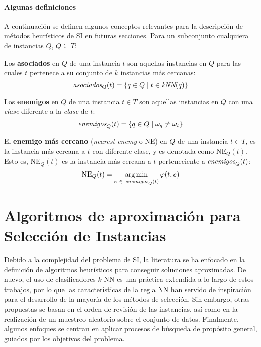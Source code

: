 \paragraph*{Algunas definiciones}
A continuación se definen algunos conceptos relevantes para la descripción de métodos heurísticos de SI en futuras secciones. Para un subconjunto cualquiera de instancias $Q$, $Q \subseteq T$:\\

\begin{definicion}
Los \textbf{asociados} en $Q$ de una instancia $t$ son aquellas instancias en $Q$ para las cuales $t$ pertenece a su conjunto de $k$ instancias más cercanas:
\begin{equation}
\emph{asociados}_Q(t) = \left\lbrace q \in Q \mid t\in \emph{kNN}(q) \right\rbrace
\end{equation}
\end{definicion}

\begin{definicion}
Los \textbf{enemigos} en $Q$ de una instancia $t \in T$ son aquellas instancias en $Q$ con una \emph{clase} diferente a la \emph{clase} de $t$:
\begin{equation}
\emph{enemigos}_Q(t) = \left\lbrace q \in Q \mid \omega_{q} \neq \omega_{t} \right\rbrace
\end{equation}
\end{definicion}

\begin{definicion}
El \textbf{enemigo más cercano} (\emph{nearest enemy} o NE) en $Q$ de una instancia $t \in T$, es la instancia más cercana a $t$ con diferente clase, y es denotada como $\mathrm{NE}_Q(t)$. Esto es, $\mathrm{NE}_Q(t)$ es la instancia más cercana a $t$ perteneciente a $\emph{enemigos}_Q(t)$:
\begin{equation}
\mathrm{NE}_Q(t) = \operatorname*{arg\,min}_{e\ \in\ \emph{enemigos}_Q(t)} \varphi(t,e)
\end{equation}
\end{definicion}

\section{Algoritmos de aproximación para Selección de Instancias}
\label{alg-aprox-si}

Debido a la complejidad del problema de SI, la literatura se ha enfocado en la definición de algoritmos heurísticos para conseguir soluciones aproximadas. De nuevo, el uso de clasificadores $k$-NN es una práctica extendida a lo largo de estos trabajos, por lo que las características de la regla NN han servido de inspiración para el desarrollo de la mayoría de los métodos de selección. Sin embargo, otras propuestas se basan en el orden de revisión de las instancias, así como en la realización de un muestreo aleatorio sobre el conjunto de datos. Finalmente, algunos enfoques se centran en aplicar procesos de búsqueda de propósito general, guiados por los objetivos del problema.

